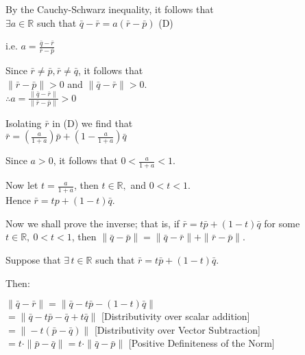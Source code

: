 \begin{proofbox}

By the Cauchy-Schwarz inequality, it follows that\\
$\exists a \in \mathbb{R}$ such that $\bar{q}-\bar{r} = a(\bar{r}-\bar{p})$ \hfill (D)

i.e. $a = \frac{\bar{q}-\bar{r}}{\bar{r}-\bar{p}}$

\vspace{1em}

Since $\bar{r} \neq \bar{p}, \bar{r} \neq \bar{q}$, it follows that \\
$\|\bar{r}-\bar{p}\| > 0$ and $\|\bar{q}-\bar{r}\| > 0$.\\
$\therefore a = \frac{\|\bar{q}-\bar{r}\|}{\|\bar{r}-\bar{p}\|} > 0$

\vspace{1em}

Isolating $\bar{r}$ in (D) we find that\\
$\bar{r} = \left(\frac{a}{1+a}\right)\bar{p} + \left(1-\frac{a}{1+a}\right)\bar{q}$

\vspace{1em}

Since $a > 0$, it follows that $0 < \frac{a}{1+a} < 1$.

Now let $t = \frac{a}{1+a}$, then $t \in \mathbb{R},$ and $0 < t < 1$.\\
Hence $\bar{r} = tp + (1-t)\bar{q}$.

\vspace{1em}

Now we shall prove the inverse; that is, if $\bar{r} = t\bar{p} + (1 - t)\bar{q}$ for some $t \in \mathbb{R},\ 0 < t < 1$,  
then $\|\bar{q} - \bar{p}\| = \|\bar{q} - \bar{r}\| + \|\bar{r} - \bar{p}\|$.

\vspace{1em}

Suppose that $\exists\, t \in \mathbb{R}$ such that $\bar{r} = t\bar{p} + (1 - t)\bar{q}$.

\vspace{1em}

Then:

$\|\bar{q} - \bar{r}\| = \|\bar{q} - t\bar{p} - (1 - t)\bar{q}\|$\\
\quad $= \|\bar{q} - t\bar{p} - \bar{q} + t\bar{q}\|$ \hfill [Distributivity over scalar addition] \\
\quad $= \|-t(\bar{p} - \bar{q})\|$ \hfill [Distributivity over Vector Subtraction] \\
\quad $= t \cdot \|\bar{p} - \bar{q}\| = t \cdot \|\bar{q} - \bar{p}\|$ \hfill [Positive Definiteness of the Norm]


\end{proofbox}
